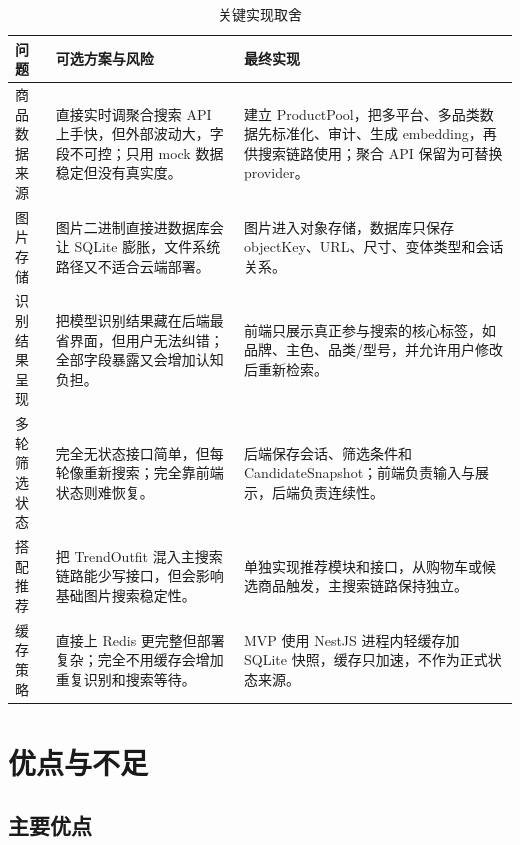 \documentclass[UTF8,a4paper,zihao=-4]{ctexart}
\begin{document}
\begin{table}[H]
\centering
\caption{关键实现取舍}
\label{tab:engineering-tradeoffs}
\begin{tabularx}{\textwidth}{p{3cm}Y Y}
\toprule
问题 & 可选方案与风险 & 最终实现 \\
\midrule
商品数据来源 & 直接实时调聚合搜索 API 上手快，但外部波动大，字段不可控；只用 mock 数据稳定但没有真实度。 & 建立 ProductPool，把多平台、多品类数据先标准化、审计、生成 embedding，再供搜索链路使用；聚合 API 保留为可替换 provider。 \\
图片存储 & 图片二进制直接进数据库会让 SQLite 膨胀，文件系统路径又不适合云端部署。 & 图片进入对象存储，数据库只保存 objectKey、URL、尺寸、变体类型和会话关系。 \\
识别结果呈现 & 把模型识别结果藏在后端最省界面，但用户无法纠错；全部字段暴露又会增加认知负担。 & 前端只展示真正参与搜索的核心标签，如品牌、主色、品类/型号，并允许用户修改后重新检索。 \\
多轮筛选状态 & 完全无状态接口简单，但每轮像重新搜索；完全靠前端状态则难恢复。 & 后端保存会话、筛选条件和 CandidateSnapshot；前端负责输入与展示，后端负责连续性。 \\
搭配推荐 & 把 TrendOutfit 混入主搜索链路能少写接口，但会影响基础图片搜索稳定性。 & 单独实现推荐模块和接口，从购物车或候选商品触发，主搜索链路保持独立。 \\
缓存策略 & 直接上 Redis 更完整但部署复杂；完全不用缓存会增加重复识别和搜索等待。 & MVP 使用 NestJS 进程内轻缓存加 SQLite 快照，缓存只加速，不作为正式状态来源。 \\
\bottomrule
\end{tabularx}
\end{table}

\section{优点与不足}

\subsection{主要优点}
\end{document}
